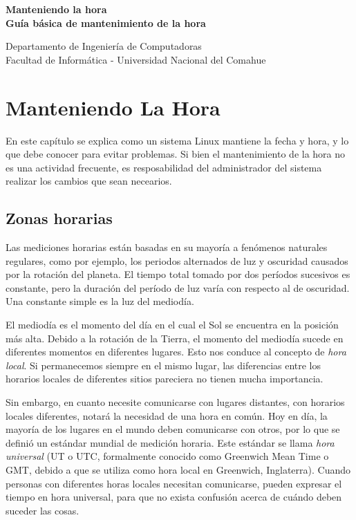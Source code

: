 \documentclass[12pt]{article}
\def\maketitle{

 \makeatletter
 {\color{bl} \centering \huge \sc \textbf{
 Manteniendo la hora \\ 
\large \vspace*{-8pt} \color{black} Guía básica de mantenimiento de la hora
 \vspace*{8pt} }\par}
 \makeatother


 \makeatletter
 {\centering \small 
 	Departamento de Ingeniería de Computadoras \\
 	Facultad de Informática - Universidad Nacional del Comahue \\
 	\vspace{20pt} }
 \makeatother

}
\begin{document}
\thispagestyle{empty}
\maketitle
\setlength{\parindent}{0pt}

\section*{ Manteniendo La Hora}

En este capítulo se explica como un sistema Linux mantiene la fecha y hora,
y lo que debe conocer para evitar problemas. Si bien el mantenimiento de
la hora no es una actividad frecuente, es resposabilidad del administrador 
del sistema realizar los cambios que sean necearios. 


\subsection*{ Zonas horarias}

Las mediciones horarias están basadas en su mayoría a fenómenos naturales regulares,
como por ejemplo, los periodos alternados de luz y oscuridad
causados por la rotación del planeta. El tiempo total tomado por dos períodos
sucesivos es constante, pero la duración del período de luz varía
con respecto al de oscuridad. Una constante simple es la luz del mediodía.

El mediodía es el momento del día en el cual el Sol se encuentra en la posición más alta. 
Debido a la rotación de la Tierra, el momento del mediodía sucede en diferentes 
momentos en diferentes lugares. Esto nos conduce al concepto de \textit{hora local}.
Si permanecemos siempre en el mismo lugar, las diferencias entre los
horarios locales de diferentes sitios pareciera no tienen mucha importancia.


Sin embargo, en cuanto necesite comunicarse con lugares distantes, con horarios locales 
diferentes, notará la necesidad de una hora en común. Hoy en día, la mayoría de los lugares en el mundo deben
comunicarse con otros, por lo que se definió un estándar mundial de medición
horaria. Este estándar se llama \textit{hora universal} (UT o UTC, formalmente
conocido como Greenwich Mean Time o GMT, debido a que se utiliza como hora
local en Greenwich, Inglaterra). Cuando personas con diferentes horas locales
necesitan comunicarse, pueden expresar el tiempo en hora universal,
para que no exista confusión acerca de cuándo deben suceder las cosas.
\end{document}
